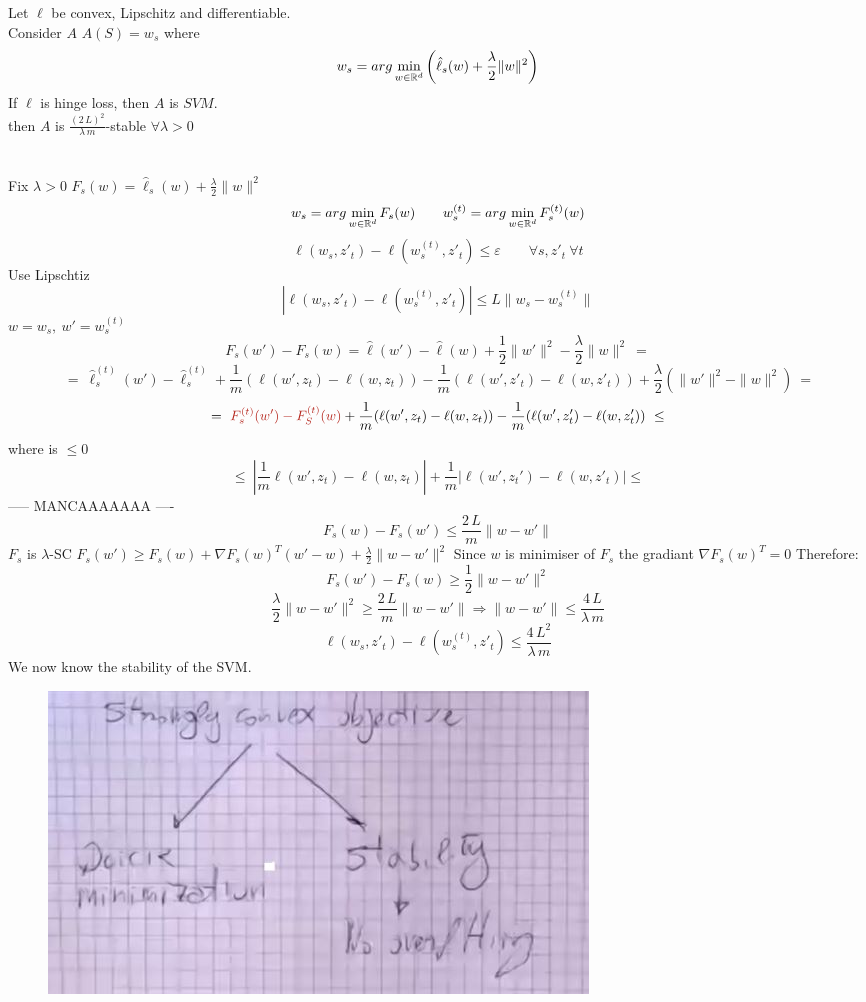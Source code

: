 \documentclass[../main.tex]{subfiles}
\begin{document}
Let $\ell$ be convex, Lipschitz and differentiable.
\\
Consider $A$ \qquad $ A(S) = w_s$ where 
\\
$$
w_s = arg \min_{w \in \mathbb{R}^d} \left( \hat{\ell}_s (w) + \frac{\lambda}{2}\| w\|^2 \right)
$$
If $\ell$ is hinge loss, then $A$ is $SVM$.\\
then $A$ is $\frac{(2 \, L)^2}{\lambda \, m}$-stable \qquad $\forall \lambda > 0 $
\\\\
\\
Fix $\lambda > 0$ \qquad $F_s (w) = \hat{\ell}_s(w) + \frac{\lambda}{2} \| w \|^2$
$$
w_s = arg \min_{w \in \mathbb{R}^d} F_s (w) \qquad w_s^{(t)} = arg \min_{w \in \mathbb{R}^d } F_s^{(t)}(w)
$$
$$
\ell(w_s,z'_t) - \ell(w_s^{(t)},z'_t) \leq \varepsilon \qquad \forall s, z'_t \ \forall t 
$$
Use Lipschtiz
$$
| \ell(w_s, z'_t) - \ell(w_s^{(t)}, z'_t) | \leq L \| w_s-w_s^{(t)} \|
$$
$w = w_s, \ w' = w_s^{(t)}$
$$
F_s(w') - F_s(w) = \hat{\ell}(w') - \hat{\ell}(w) + \frac{1}{2} \| w' \|^2 - \frac{\lambda}{2} \|w \|^2 \ =
$$
$$
\ = \
 \hat{\ell}_s^{(t)}(w') - \hat{\ell}_s^{(t)} + \frac{1}{m} \left( \ell(w', z_t) - \ell(w,z_t) \right) - \frac{1}{m} \left( \ell(w', z'_t ) - \ell(w, z'_t) \right) + \frac{\lambda}{2} ( \| w'\|^2 - \| w \|^2 ) \ =
$$
$$
= \ \red{F_s^{(t)} (w') - F_S^{(t)}(w)} + \frac{1}{m} (\ell(w', z_t) - \ell (w,z_t) ) - \frac{1}{m}( \ell(w',z'_t)-\ell(w,z'_t)) \ \leq
$$
where  is $\leq 0$
$$
\ \leq \ |\frac{1}{m}\ell(w',z_t) - \ell(w, z_t) | + \frac{1}{m} | \ell(w',z_t') - \ell(w, z'_t) | \leq \
$$
  ----- MANCAAAAAAA ----
$$
F_s(w) - F_s(w') \leq \frac{2 \, L}{m} \| w- w'\|
$$
$F_s$ is $\lambda$-SC \qquad $F_s(w') \geq F_s(w) + \nabla F_s(w)^T (w'-w)+\frac{\lambda}{2}\|w- w'\|^2$
Since $w$ is minimiser of $F_s$ the gradiant $ \nabla F_s(w)^T = 0$
Therefore:
$$
F_s(w') - F_s(w) \geq \frac{1}{2}
 \| w- w'\|^2 $$
$$
\frac{\lambda}{2} \| w- w'\|^2 \geq \frac{2 \, L}{m} \|w-w'\| \Rightarrow \| w-w' \| \leq \frac{4 \, L}{\lambda \, m} 
$$
$$
\ell(w_s, z'_t) - \ell(w_s^{(t)}, z'_t) \leq \frac{4 \, L^2}{\lambda \, m}
$$
We now know the stability of the SVM.
\begin{figure}[h]
    \centering
    \includegraphics[width=0.8\linewidth]{../img/lez21-img1.JPG}
    \caption{}
\end{figure}
\end{document}
